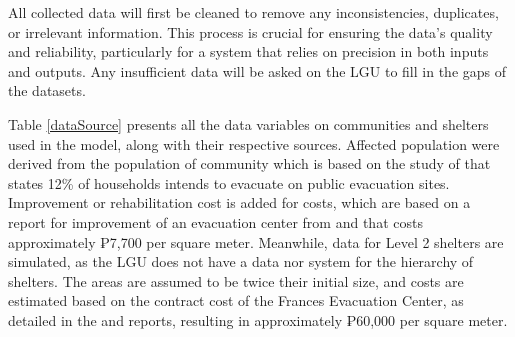 	All collected data will first be cleaned to remove any inconsistencies, duplicates, or irrelevant information. This process is crucial for ensuring the data’s quality and reliability, particularly for a system that relies on precision in both inputs and outputs. Any insufficient data will be asked on the LGU to fill in the gaps of the datasets. 
	
	Table \ref{dataSource} presents all the data variables on communities and shelters used in the model, along with their respective sources. Affected population were derived from the population of community which is based on the study of \textcite{Opdyke2024} that states 12\% of households intends to evacuate on public evacuation sites. Improvement or rehabilitation cost is added for costs, which are based on a report for improvement of an evacuation center from \textcite{DilgL1area2022} and \textcite{DilgL1cost2022} that costs approximately ₱7,700 per square meter. Meanwhile, data for Level 2 shelters are simulated, as the LGU does not have a data nor system for the hierarchy of shelters. The areas are assumed to be twice their initial size, and costs are estimated based on the contract cost of the Frances Evacuation Center, as detailed in the \textcite{DilgL22022} and \textcite{Dpwh2022} reports, resulting in approximately ₱60,000 per square meter. 
	
